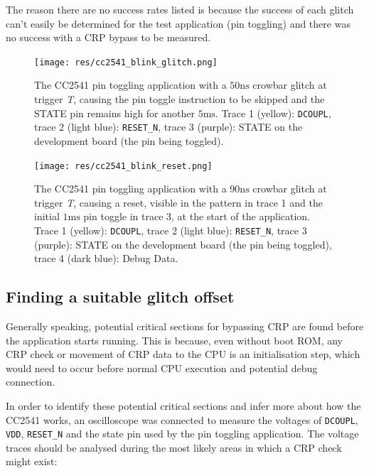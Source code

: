 The reason there are no success rates listed is because the success of
each glitch can't easily be determined for the test application (pin
toggling) and there was no success with a CRP bypass to be measured.

\begin{figure}
\centering
\texttt{[image: res/cc2541\_blink\_glitch.png]}
\caption{The CC2541 pin toggling application with a
\(50\si{\nano\second}\) crowbar glitch at trigger \emph{T}, causing the
pin toggle instruction to be skipped and the STATE pin remains high for
another \(5\si{\milli\second}\). Trace 1 (yellow): \texttt{DCOUPL},
trace 2 (light blue): \texttt{RESET\_N}, trace 3 (purple): STATE on the
development board (the pin being toggled).
\label{img_cc2541_blink_glitch}}
\end{figure}

\begin{figure}
\centering
\texttt{[image: res/cc2541\_blink\_reset.png]}
\caption{The CC2541 pin toggling application with a
\(90\si{\nano\second}\) crowbar glitch at trigger \emph{T}, causing a
reset, visible in the pattern in trace 1 and the initial
\(1\si{\milli\second}\) pin toggle in trace 3, at the start of the
application. Trace 1 (yellow): \texttt{DCOUPL}, trace 2 (light blue):
\texttt{RESET\_N}, trace 3 (purple): STATE on the development board (the
pin being toggled), trace 4 (dark blue): Debug Data.
\label{img_cc2541_blink_reset}}
\end{figure}

\hypertarget{finding-a-suitable-glitch-offset-1}{%
\subsection{\texorpdfstring{Finding a suitable glitch
offset\label{section_cc2541_suitable_offset}}{Finding a suitable glitch offset}}\label{finding-a-suitable-glitch-offset-1}}

Generally speaking, potential critical sections for bypassing CRP are
found before the application starts running. This is because, even
without boot ROM, any CRP check or movement of CRP data to the CPU is an
initialisation step, which would need to occur before normal CPU
execution and potential debug connection.

In order to identify these potential critical sections and infer more
about how the CC2541 works, an oscilloscope was connected to measure the
voltages of \texttt{DCOUPL}, \texttt{VDD}, \texttt{RESET\_N} and the
state pin used by the pin toggling application. The voltage traces
should be analysed during the most likely areas in which a CRP check
might exist:

